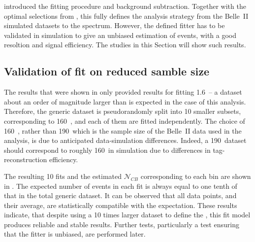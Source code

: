  introduced the fitting procedure and \BB background subtraction.
Together with the optimal selections from , this fully defines the analysis strategy from the Belle~II simulated datasets to the \BtoXsgamma spectrum.
However, the defined fitter has to be validated in simulation to give an unbiased estimation of \BtoXsgamma events, with a good resoltion and signal efficiency.
The studies in this Section will show such results.

\subsection{Validation of \texorpdfstring{\Mbc}{Mbc} fit on reduced samble size}\label{sec:mbc_fit_validation_misreconstructed}

The results that were shown in  only provided results for fitting 1.6~\invab -- a dataset about an order of magnitude larger than is expected in the case of this analysis.
Therefore, the generic \MC dataset is pseudorandomly split into 10 smaller subsets, corresponding to 160~\invfb, and each of them are fitted independently.
The choice of 160~\invfb, rather than 190~\invfb which is the sample size of the Belle~II data used in the analysis, is due to anticipated data-simulation differences.
Indeed, a 190~\invfb dataset should correspond to roughly 160~\invfb in simulation due to differences in tag-\B reconstruction efficiency.

The resulting 10 fits and the estimated $\mathcal{N}_{CB}$ corresponding to each \EB bin are shown in .
The expected number of events in each fit is always equal to one tenth of that in the total generic \MC dataset.
It can be observed that all data points, and their average, are statistically compatible with the expectation.
These results indicate, that despite using a 10 times larger dataset to define the , this \Mbc fit model produces reliable and stable results.
Further tests, particularly a test ensuring that the fitter is unbiased, are performed later.


